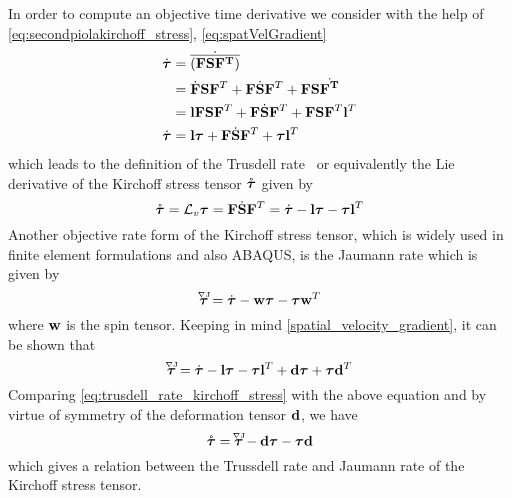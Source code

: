 In order to compute an objective time derivative we consider with the help of \cref{eq:secondpiolakirchoff_stress}, \cref{eq:spatVelGradient} 
\begin{align}
    \nonumber \dot{\bm{\tau}} 
    &= \dot{\overline{(\mathbf{F} \mathbf{S} \mathbf{F}^{T})}} \\
    \nonumber
    &= \dot{\mathbf{F}} \mathbf{S} \mathbf{F}^{T} + \mathbf{F} \dot{\mathbf{S}} \mathbf{F}^{T} + \mathbf{F} \mathbf{S} \dot{\mathbf{F}^{T}} \\
    \nonumber
     &= \mathbf{l} \mathbf{F} \mathbf{S} \mathbf{F}^{T} + \mathbf{F} \dot{\mathbf{S}} \mathbf{F}^{T} + \mathbf{F} \mathbf{S} \mathbf{F}^{T} \mathbf{l}^{T} \\
     \dot{\bm{\tau}}
     &= \mathbf{l} \bm{\tau} + \mathbf{F} \dot{\mathbf{S}} \mathbf{F}^{T} + \bm{\tau} \mathbf{l}^{T}
     \label{eq:trusdell_rate_kirchoff_stress}
\end{align}
which leads to the definition of the Trusdell rate~\cite{Truesdell1965} or equivalently the Lie derivative of the Kirchoff stress tensor \(\mathring{\bm{\tau}}\) given by
\begin{equation}
    \mathring{\bm{\tau}} = \mathcal{L}_v \bm{\tau} 
    =  \mathbf{F} \dot{\mathbf{S}} \mathbf{F}^{T}
    = \dot{\bm{\tau}} - \mathbf{l} \bm{\tau} - \bm{\tau} \mathbf{l}^{T}
    \label{eq:trusdell_rate_kirchoff_stress}
\end{equation}
Another objective rate form of the Kirchoff stress tensor, which is widely used in finite element formulations and also ABAQUS, is the Jaumann rate which is given by
\begin{equation}
    \accentset{\nabla{}\text{J}}{\bm{\tau}} =  \dot{\bm{\tau}} - \mathbf{w} \bm{\tau} - \bm{\tau} \mathbf{w}^{T} 
    \label{eq:jaumann_rate_kirchoff_stress}
\end{equation}
where \(\mathbf{w}\) is the spin tensor. Keeping in mind \cref{spatial_velocity_gradient}, it can be shown that
\begin{equation}
    \accentset{\nabla{}\text{J}}{\bm{\tau}} = \dot{\bm{\tau}} - \mathbf{l} \bm{\tau} - \bm{\tau} \mathbf{l}^{T} + \mathbf{d} \bm{\tau} + \bm{\tau} \mathbf{d}^{T}
\end{equation}
Comparing \cref{eq:trusdell_rate_kirchoff_stress} with the above equation and by virtue of symmetry of the deformation tensor \(\mathbf{d}\), we have 
\begin{equation}
    \mathring{\bm{\tau}} = \accentset{\nabla{}\text{J}}{\bm{\tau}} - \mathbf{d} \bm{\tau} - \bm{\tau} \mathbf{d} 
    \label{eq:trusdell_jaumann_rate_relation}   
\end{equation}
which gives a relation between the Trussdell rate and Jaumann rate of the Kirchoff stress tensor.

